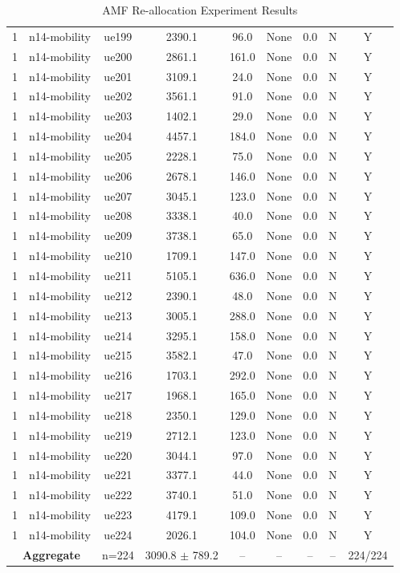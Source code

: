 \begin{table}[ht]
\begin{tabular}{|c|c|c|c|c|c|c|c|c|}
1 & n14-mobility & ue199 & 2390.1 & 96.0 & None & 0.0 & N & Y \\
1 & n14-mobility & ue200 & 2861.1 & 161.0 & None & 0.0 & N & Y \\
1 & n14-mobility & ue201 & 3109.1 & 24.0 & None & 0.0 & N & Y \\
1 & n14-mobility & ue202 & 3561.1 & 91.0 & None & 0.0 & N & Y \\
1 & n14-mobility & ue203 & 1402.1 & 29.0 & None & 0.0 & N & Y \\
1 & n14-mobility & ue204 & 4457.1 & 184.0 & None & 0.0 & N & Y \\
1 & n14-mobility & ue205 & 2228.1 & 75.0 & None & 0.0 & N & Y \\
1 & n14-mobility & ue206 & 2678.1 & 146.0 & None & 0.0 & N & Y \\
1 & n14-mobility & ue207 & 3045.1 & 123.0 & None & 0.0 & N & Y \\
1 & n14-mobility & ue208 & 3338.1 & 40.0 & None & 0.0 & N & Y \\
1 & n14-mobility & ue209 & 3738.1 & 65.0 & None & 0.0 & N & Y \\
1 & n14-mobility & ue210 & 1709.1 & 147.0 & None & 0.0 & N & Y \\
1 & n14-mobility & ue211 & 5105.1 & 636.0 & None & 0.0 & N & Y \\
1 & n14-mobility & ue212 & 2390.1 & 48.0 & None & 0.0 & N & Y \\
1 & n14-mobility & ue213 & 3005.1 & 288.0 & None & 0.0 & N & Y \\
1 & n14-mobility & ue214 & 3295.1 & 158.0 & None & 0.0 & N & Y \\
1 & n14-mobility & ue215 & 3582.1 & 47.0 & None & 0.0 & N & Y \\
1 & n14-mobility & ue216 & 1703.1 & 292.0 & None & 0.0 & N & Y \\
1 & n14-mobility & ue217 & 1968.1 & 165.0 & None & 0.0 & N & Y \\
1 & n14-mobility & ue218 & 2350.1 & 129.0 & None & 0.0 & N & Y \\
1 & n14-mobility & ue219 & 2712.1 & 123.0 & None & 0.0 & N & Y \\
1 & n14-mobility & ue220 & 3044.1 & 97.0 & None & 0.0 & N & Y \\
1 & n14-mobility & ue221 & 3377.1 & 44.0 & None & 0.0 & N & Y \\
1 & n14-mobility & ue222 & 3740.1 & 51.0 & None & 0.0 & N & Y \\
1 & n14-mobility & ue223 & 4179.1 & 109.0 & None & 0.0 & N & Y \\
1 & n14-mobility & ue224 & 2026.1 & 104.0 & None & 0.0 & N & Y \\
\multicolumn{2}{|c|}{\textbf{Aggregate}} & n=224 & 3090.8 $\pm$ 789.2 & -- & -- & -- & -- & 224/224 \\
\hline
\end{tabular}
\caption{AMF Re-allocation Experiment Results}
\label{tab:amf_realloc}
\end{table}
